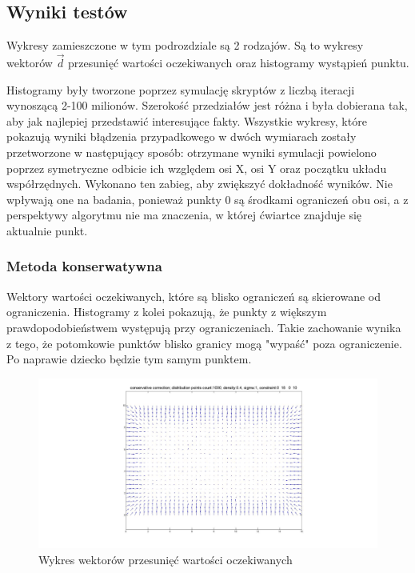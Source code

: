 \documentclass{mini}
\begin{document}
\subsection{Wyniki testów}
Wykresy zamieszczone w tym podrozdziale są 2 rodzajów. Są to wykresy wektorów $\overrightarrow{d}$ przesunięć wartości oczekiwanych oraz histogramy wystąpień punktu.

Histogramy były tworzone poprzez symulację skryptów z liczbą iteracji wynoszącą \mbox{2-100} milionów. Szerokość przedziałów jest różna i była dobierana tak, aby jak najlepiej przedstawić interesujące fakty. Wszystkie wykresy, które pokazują wyniki błądzenia przypadkowego w dwóch wymiarach zostały przetworzone w następujący sposób: otrzymane wyniki symulacji powielono poprzez symetryczne odbicie ich względem osi X, osi Y oraz początku układu współrzędnych. Wykonano ten zabieg, aby zwiększyć dokładność wyników. Nie wpływają one na badania, ponieważ punkty 0 są środkami ograniczeń obu osi, a z perspektywy algorytmu nie ma znaczenia, w której ćwiartce znajduje się aktualnie punkt.

\subsubsection*{Metoda konserwatywna}
Wektory wartości oczekiwanych, które są blisko ograniczeń są skierowane od ograniczenia. Histogramy z kolei pokazują, że punkty z większym prawdopodobieństwem występują przy ograniczeniach. Takie zachowanie wynika z tego, że potomkowie punktów blisko granicy mogą "wypaść" poza ograniczenie. Po naprawie dziecko będzie tym samym punktem.

\begin{figure}[H]
\centering
\includegraphics[width=\textwidth]{conservative2dprzesuniecie}
\caption{Wykres wektorów przesunięć wartości oczekiwanych}
\end{figure}
\end{document}
